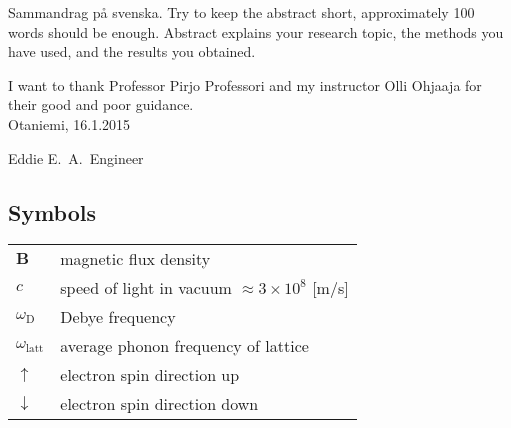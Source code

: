 \documentclass[english,12pt,a4paper,pdftex,sci,utf8]{aaltothesis}
\begin{document}
\newpage
%
%
\begin{abstractpage}[swedish]
 Sammandrag p\aa{} svenska.
 Try to keep the abstract short, approximately
 100 words should be enough. Abstract explains your research topic,
 the methods you have used, and the results you obtained.
\end{abstractpage}

I want to thank Professor Pirjo Professori
and my instructor Olli Ohjaaja for their
good and poor guidance.\\

\vspace{5cm}
Otaniemi, 16.1.2015

\vspace{5mm}
{\hfill Eddie E.\ A.\ Engineer \hspace{1cm}}

\newpage


\thesistableofcontents



\subsection*{Symbols}

\begin{tabular}{ll}
$\mathbf{B}$  & magnetic flux density  \\
$c$              & speed of light in vacuum $\approx 3\times10^8$ [m/s]\\
$\omega_{\mathrm{D}}$    & Debye frequency \\
$\omega_{\mathrm{latt}}$ & average phonon frequency of lattice \\
$\uparrow$       & electron spin direction up\\
$\downarrow$     & electron spin direction down
\end{tabular}
\end{document}
